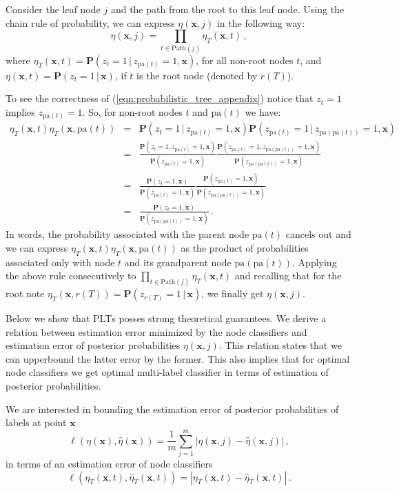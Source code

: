 \documentclass{article}
\newcommand{\Algo}[1]{\textsc{#1}}
\renewcommand{\vec}[1]{\boldsymbol{#1}}
\newcommand{\bx}{\vec{x}}
\newcommand{\heta}{\hat{\eta}}
\newcommand{\pa}[1]{\mathrm{pa}(#1)}
\newcommand{\Path}[1]{\mathrm{Path}(#1)}
\newcommand{\prob}{\mathbf{P}}
\newcommand{\given}{\, | \,}
\begin{document}
Consider the leaf node $j$ and the path from the root to this leaf node. Using the chain rule of probability, we can express $\eta(\bx, j)$ in the following way:
\begin{equation}
\eta(\bx, j) = \prod_{t \in \Path{j}} \eta_T(\bx, t)\,,
\label{eqn:probabilistic_tree_appendix}
\end{equation}
where $\eta_T(\bx, t) = \prob(z_t = 1 \given z_{\pa{t}} =1, \bx)$, for all non-root nodes $t$, and $\eta(\bx, t) = \prob(z_t = 1 \given \bx)$, if $t$ is the root node (denoted by $r(T)$). 

To see the correctness of (\ref{eqn:probabilistic_tree_appendix}) notice that $z_{t} = 1$ implies $z_{\pa{t}} = 1$. So, for non-root nodes $t$ and $\pa{t}$ we have:
\begin{eqnarray*}
\eta_T(\bx,t) \eta_T(\bx, \pa{t}) & = &  \prob(z_t = 1 \given z_{\pa{t}} =1, \bx)\prob(z_{\pa{t}} = 1 \given z_{\pa{\pa{t}}} =1, \bx)\\
& = & \frac{\prob(z_t = 1 , z_{\pa{t}} =1, \bx)}{\prob(z_{\pa{t}} =1, \bx)} \frac{\prob(z_{\pa{t}} = 1, z_{\pa{\pa{t}}} =1, \bx)}{\prob(z_{\pa{\pa{t}}} =1, \bx)} \\
& = & \frac{\prob(z_t = 1, \bx)}{\prob(z_{\pa{t}} =1, \bx)} \frac{\prob(z_{\pa{t}} = 1, \bx)}{\prob(z_{\pa{\pa{t}}} =1, \bx)} \\
& = & \frac{\prob(z_t = 1, \bx)}{\prob(z_{\pa{\pa{t}}} =1, \bx)} \,.
\end{eqnarray*}
In words, the probability associated with the parent node $\pa{t}$ cancels out and we can express $\eta_T(\bx,t) \eta_T(\bx, \pa{t})$ as the product of probabilities associated only with node $t$ and its grandparent node $\pa{\pa{t}}$. 
%
Applying the above rule consecutively to $\prod_{t \in \Path{j}} \eta_T(\bx, t)$ and recalling that for the root note $\eta_T(\bx, r(T)) = \prob(z_{r(T)} = 1 \given \bx)$, we finally get $\eta(\bx, j)$. 

Below we show that \Algo{PLT}s posses strong theoretical guarantees. We derive a relation between  estimation error minimized by the node classifiers and estimation error of posterior probabilities $\eta(\bx,j)$. This relation states that we can upperbound the latter error by the former. This also implies that for optimal node classifiers we get optimal multi-label classifier in terms of estimation of posterior probabilities.

We are interested in bounding the estimation error of posterior probabilities of labels at point $\bx$
$$
\ell(\eta(\bx),\heta(\bx)) = \frac{1}{m} \sum_{j=1}^m |\eta(\bx, j) - \heta(\bx, j)| \,,
$$
in terms of an estimation error of node classifiers
$$
\ell(\eta_T(\bx, t), \heta_T(\bx, t)) = |\eta_T(\bx, t) - \heta_T(\bx, t)  | \,.
$$
\end{document}
